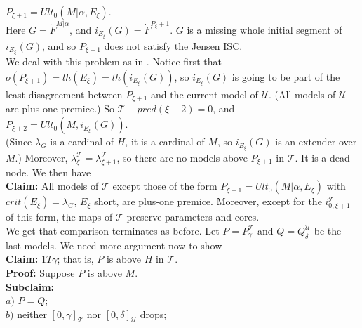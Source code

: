 \documentclass[12pt]{article}
\begin{document}
\indent \indent $P_{\xi + 1} = Ult_0 (M | \alpha , E_\xi )$.\\

Here $G = \dot{F}^{M | \alpha}$, and $i_{E_\xi} (G) = \dot{F}^{P_\xi + 1}$.  $G$ is a missing whole initial segment of $i_{E_\xi} (G)$, and so $P_{\xi + 1}$ does not satisfy the Jensen ISC.\\

We deal with this problem as in \cite{FSPIPM}.  Notice first that $o(P_{\xi + 1}) = lh(E_\xi) = lh ( i_{E_\xi} (G))$, so $i_{E_\xi} (G)$ is going to be part of the least disagreement between $P_{\xi+1}$ and the current model of $\mathscr{U}$.  (All models of $\mathscr{U}$ are plus-one premice.)  So $\mathscr{T}-pred (\xi + 2) = 0$, and\\

\indent \indent $P_{\xi + 2} = Ult_0 (M , i_{E_\xi} (G) )$.\\

(Since $\lambda_G$ is a cardinal of $H$, it is a cardinal of $M$, so $i_{E_\xi} (G)$ is an extender over $M$.)  Moreover, $\lambda_\xi^{\mathscr{T}} = \lambda_{\xi + 1}^{\mathscr{T}}$, so there are no models above $P_{\xi + 1}$ in $\mathscr{T}$.  It is a dead node.  We then have\\

\textbf{Claim:} All models of $\mathscr{T}$ except those of the form $P_{\xi + 1} = Ult_0 ( M | \alpha , E_\xi )$ with $crit( E_\xi ) = \lambda_G$, $E_\xi$ short, are plus-one premice.  Moreover, except for the $i_{0, \xi + 1}^{\mathscr{T}}$ of this form, the maps of $\mathscr{T}$ preserve parameters and cores.\\

We get that comparison terminates as before.  Let $P = P_\gamma^{\mathscr{T}}$ and $Q = Q_\delta^{\mathscr{U}}$ be the last models.  We need more argument now to show\\

\textbf{Claim:} $1 T \gamma$; that is, $P$ is above $H$ in $\mathscr{T}$.\\

\indent \indent \textbf{Proof:} Suppose $P$ is above $M$.\\

\textbf{Subclaim:}\\

\indent $a)$ $P = Q$;\\

\indent $b)$ neither $[ 0 , \gamma ]_{\mathscr{T}}$ nor $[ 0 , \delta ]_{\mathscr{U}}$ drops;\\
\end{document}

